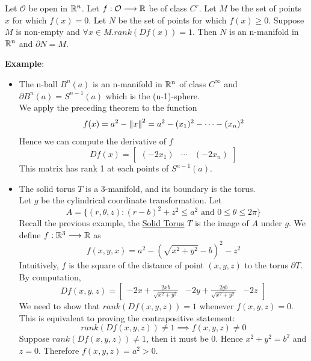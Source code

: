 \begin{theorem}
    Let $\mathcal{O}$ be open in $\mathbb{R}^n$. Let $f:\mathcal{O}\longrightarrow \mathbb{R}$ be of class $C^r$. 
    Let $M$ be the set of points $x$ for which $f(x)=0$. Let $N$ be the set of points for which $f(x)\geq0$. 
    Suppose $M$ is non-empty and $\forall x \in M.rank(Df(x))=1$. Then $N$ is an n-manifold in $\mathbb{R}^n$ and $\partial N=M$.
\end{theorem}
\noindent\textbf{Example}:
\begin{itemize}
    \item The n-ball $B^n(a)$ is an n-manifold in $\mathbb{R}^n$ of class $C^{\infty}$ and $\partial B^n(a)=S^{n-1}(a)$ which is the (n-1)-sphere.\\ 
    We apply the preceding theorem to the function $$f(x)=a^2-\left\lVert x \right\rVert^2=a^2-(x_1)^2-\cdots-(x_n)^2$$
    Hence we can compute the derivative of $f$ $$Df(x)=\begin{bmatrix}
        (-2x_1) & \cdots & (-2x_n)
    \end{bmatrix}$$
    This matrix has rank 1 at each points of $S^{n-1}(a)$.
    \item The  solid torus $T$ is a 3-manifold, and its boundary is the torus.\\
    Let $g$ be the cylindrical coordinate transformation. Let $$A=\{(r,\theta,z):(r-b)^2+z^2\leq a^2\text{ and }0\leq \theta\leq 2\pi\}$$
    Recall the previous example, the \underline{Solid Torus} $T$ is the image of $A$ under $g$. We define $f:\mathbb{R}^3\longrightarrow\mathbb{R}$ as $$f(x,y,x)=a^2-(\sqrt{x^2+y^2}-b)^2-z^2$$
    Intuitively, $f$ is the square of the distance of point $(x,y,z)$ to the torus $\partial T$. By computation, 
    $$Df(x,y,z)=\begin{bmatrix}
        -2x+\frac{2xb}{\sqrt{x^2+y^2}}& -2y+\frac{2yb}{\sqrt{x^2+y^2}}&-2z
    \end{bmatrix}$$
    We need to show that $rank(Df(x,y,z))=1$ whenever $f(x,y,z)=0$. This is equivalent to proving the contrapositive statement: 
    $$rank(Df(x,y,z))\neq1\implies f(x,y,z)\neq0$$
    Suppose $rank(Df(x,y,z))\neq1$, then it must be 0. Hence $x^2+y^2=b^2$ and $z=0$. Therefore $f(x,y,z)=a^2>0$.
\end{itemize}


